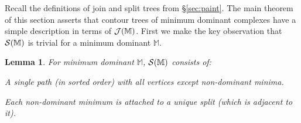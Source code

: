 \documentclass[11pt]{article}
\newtheorem{lemma}[theorem]{Lemma}
\newtheorem{definition}[theorem]{Definition}
\theoremstyle{definition}
\newcommand{\cJ}{{\cal J}}
\newcommand{\cS}{{\cal S}}
\newcommand{\cV}{{\cal V}}
\newcommand{\MM}{\mathbb{M}}
\newcommand{\Sec}[1]{\hyperref[sec:#1]{\S\ref*{sec:#1}}} %
\begin{document}
%
% 
% 

Recall the definitions of join and split trees from \Sec{paint}.
The main theorem of this section asserts that contour trees of minimum dominant complexes have a simple description in terms of $\cJ(\MM)$.  
First we make the key observation that $\cS(\MM)$ is trivial for a minimum dominant $\MM$.

\begin{lemma} \label{lem:split} For minimum dominant $\MM$, $\cS(\MM)$ consists of:
\begin{asparaitem}
	\item A single path (in sorted order) with all vertices except non-dominant minima.
	\item Each non-dominant minimum is attached to a unique split (which is adjacent to it).
\end{asparaitem}
\end{lemma}
\end{document}
